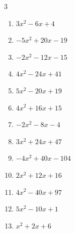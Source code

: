\begin{multicols}{3}
\begin{enumerate}

  \item $3x^{2}-6x+4$


\columnbreak %

\resetques

  \item $-5x^{2}+20x-19$


  \item $-2x^{2}-12x-15$


  \item $4x^{2}-24x+41$


  \item $5x^{2}-20x+19$


  \item $4x^{2}+16x+15$


  \item $-2x^{2}-8x-4$


  \item $3x^{2}+24x+47$


  \item $-4x^{2}+40x-104$


  \item $2x^{2}+12x+16$


  \item $4x^{2}-40x+97$


\columnbreak %

  \item $5x^{2}-10x+1$


  \item $x^{2}+2x+6$


\end{enumerate}
\end{multicols}
